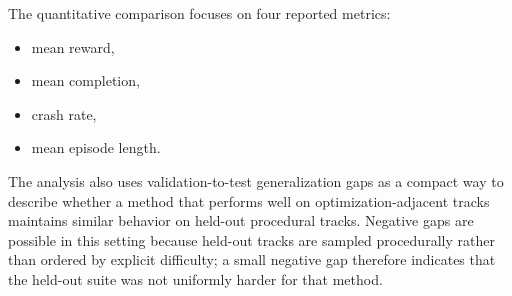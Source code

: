 The quantitative comparison focuses on four reported metrics:
\begin{itemize}[leftmargin=1.5em]
    \item mean reward,
    \item mean completion,
    \item crash rate,
    \item mean episode length.
\end{itemize}

The analysis also uses validation-to-test generalization gaps as a compact way to describe whether a method that performs well on optimization-adjacent tracks maintains similar behavior on held-out procedural tracks. Negative gaps are possible in this setting because held-out tracks are sampled procedurally rather than ordered by explicit difficulty; a small negative gap therefore indicates that the held-out suite was not uniformly harder for that method.
